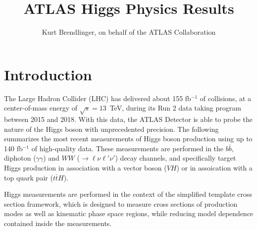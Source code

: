 \documentclass{moriond}
\begin{document}
\linenumbers

\vspace*{4cm}
\title{ATLAS Higgs Physics Results}

\author{ Kurt Brendlinger, on behalf of the ATLAS Collaboration }

\address{~\\DESY, Notkestra\ss e 85,\\ 22607 Hamburg, Germany}

\maketitle{}

\section{Introduction}

The Large Hadron Collider (LHC) \cite{Evans:2008zzb} has delivered about 155 fb$^{-1}$ of
collisions, at a center-of-mass energy of $\sqrt{s}=13$~TeV, during its Run 2 data taking program
between 2015 and 2018.
With this data, the
ATLAS Detector \cite{PERF-2007-01} is able to probe the nature of the Higgs boson with unprecedented
precision. The following summarizes the most recent measurements of Higgs boson production using up
to 140 fb$^{-1}$ of high-quality data. These measurements are performed in the $b\bar b$,
diphoton ($\gamma\gamma$) and $WW$ (${\rightarrow}\ell\nu\ell'\nu'$) decay channels, and specifically
target Higgs production in association with a vector boson ($VH$) or in assoication with a top
quark pair ($t\bar tH$).

Higgs measurements are performed in the context of the simplified template cross section framework,
which is designed to measure cross sections of production modes as well as kinematic phase space
regions, while reducing model dependence contained inside the measurements.
\end{document}
